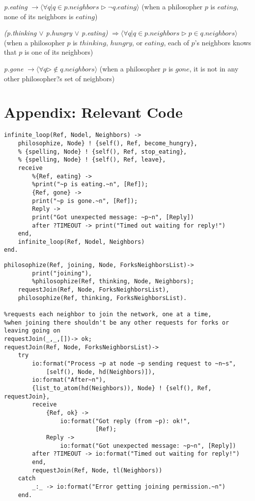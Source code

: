 \documentclass[11pt]{article}
\begin{document}
\indent

{\it p.eating} $\rightarrow \langle \forall q | q \in p.neighbors \rhd \neg q.eating \rangle$
(when a philosopher $p$ is $eating$, none of its neighbors is $eating$)

\indent 

{\it (p.thinking $\vee$ p.hungry $\vee$ p.eating)} $\Rightarrow \langle \forall q | q \in p.neighbors \rhd p \in q.neighbors \rangle$
(when a philosopher $p$ is $thinking$, $hungry$, or $eating$, each of $p$'s neighbors knows that $p$ is one of its neighbors)

\indent

{\it p.gone} $\rightarrow \langle \forall q  \rhd \not\in q.neighbors \rangle$
(when a philosopher $p$ is $gone$, it is not in any other philosopher?s set of neighbors)

\indent


\section{Appendix: Relevant Code}

\begin{lstlisting}
infinite_loop(Ref, Nodel, Neighbors) ->
    philosophize, Node} ! {self(), Ref, become_hungry},
    % {spelling, Node} ! {self(), Ref, stop_eating},
    % {spelling, Node} ! {self(), Ref, leave},
    receive
        %{Ref, eating} ->          
        %print("~p is eating.~n", [Ref]);
        {Ref, gone} ->
        print("~p is gone.~n", [Ref]);
        Reply ->
        print("Got unexpected message: ~p~n", [Reply])
        after ?TIMEOUT -> print("Timed out waiting for reply!")
    end,
    infinite_loop(Ref, Nodel, Neighbors)
end.
\end{lstlisting}

\begin{lstlisting}
philosophize(Ref, joining, Node, ForksNeighborsList)->
        print("joining"),
        %philosophize(Ref, thinking, Node, Neighbors);
    requestJoin(Ref, Node, ForksNeighborsList),
    philosophize(Ref, thinking, ForksNeighborsList).
    
%requests each neighbor to join the network, one at a time,
%when joining there shouldn't be any other requests for forks or leaving going on
requestJoin(_,_,[])-> ok;
requestJoin(Ref, Node, ForksNeighborsList)->
    try
        io:format("Process ~p at node ~p sending request to ~n~s",
            [self(), Node, hd(Neighbors)]),
        io:format("After~n"),
        {list_to_atom(hd(Neighbors)), Node} ! {self(), Ref, requestJoin},
        receive
            {Ref, ok} ->
                io:format("Got reply (from ~p): ok!",
                          [Ref);
            Reply ->
                io:format("Got unexpected message: ~p~n", [Reply])
        after ?TIMEOUT -> io:format("Timed out waiting for reply!")
        end,
        requestJoin(Ref, Node, tl(Neighbors))
    catch
        _:_ -> io:format("Error getting joining permission.~n")
    end.
\end{lstlisting}
\end{document}
